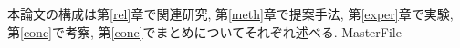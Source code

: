 \documentclass[a4j,12pt]{thesis} %
\begin{document}
\par 本論文の構成は第\ref{rel}章で関連研究, 第\ref{meth}章で提案手法, 第\ref{exper}章で実験, 第\ref{conc}で考察, 第\ref{conc}でまとめについてそれぞれ述べる.
\expandafter\ifx\csname MasterFile\endcsname\relax
\def\MasterFile{本原稿です}

% 
% 

% 

\end{document}
